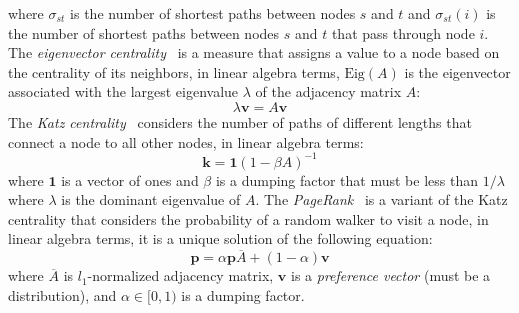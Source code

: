 where \(\sigma_{st}\) is the number of shortest paths between nodes \(s\) and \(t\) and \(\sigma_{st}(i)\) is the number of shortest paths between nodes \(s\) and \(t\) that pass through node \(i\).
The \emph{eigenvector centrality}~\cite{Bonacich72} is a measure that assigns a value to a node based on the centrality of its neighbors, in linear algebra terms, \(\text{Eig}(A)\) is the eigenvector associated with the largest eigenvalue \(\lambda\) of the adjacency matrix \(A\):
\begin{equation}
\lambda\boldsymbol{v} = A\boldsymbol{v}
\end{equation}
The \emph{Katz centrality}~\cite{Katz53} considers the number of paths of different lengths that connect a node to all other nodes, in linear algebra terms:
\begin{equation}
\boldsymbol{k} = \boldsymbol{1}(1 - \beta A)^{-1}
\end{equation}
where \(\boldsymbol{1}\) is a vector of ones and \(\beta\) is a dumping factor that must be less than \(1/\lambda\) where \(\lambda\) is the dominant eigenvalue of \(A\).
The \emph{PageRank}~\cite{Brin98} is a variant of the Katz centrality that considers the probability of a random walker to visit a node, in linear algebra terms, it is a unique solution of the following equation:
\begin{equation}
\boldsymbol{p} = \alpha \boldsymbol{p} \overline{A} + (1 - \alpha)\boldsymbol{v}
\end{equation}
where \(\overline{A}\) is \(l_1\)-normalized adjacency matrix, \(\boldsymbol{v}\) is a \emph{preference vector} (must be a distribution), and \(\alpha \in [0, 1)\) is a dumping factor.
